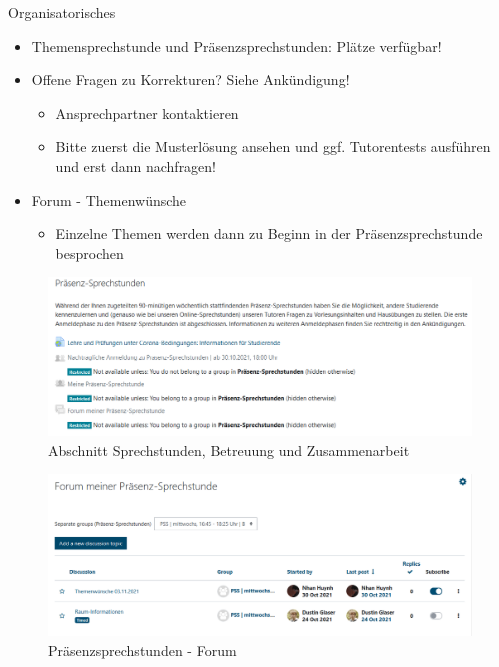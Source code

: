 \documentclass{../tuda-beamer}
\date{03. November 2021}
\begin{document}
  \maketitle

  \begin{frame}{Organisatorisches}
    \begin{itemize}
      \item Themensprechstunde und Präsenzsprechstunden: Plätze verfügbar!
      \item Offene Fragen zu Korrekturen? Siehe Ankündigung!
      \begin{itemize}
        \item Ansprechpartner kontaktieren
        \item Bitte zuerst die Musterlösung ansehen und ggf. Tutorentests ausführen und erst dann
        nachfragen!
      \end{itemize}
      \item Forum - Themenwünsche
      \begin{itemize}
        \item Einzelne Themen werden dann zu Beginn in der Präsenzsprechstunde besprochen
      \end{itemize}
    \end{itemize}
  \end{frame}

  \begin{frame}[c]
    \begin{figure}[h]
      \centering
      \includegraphics[width=\linewidth]{graphics/pss_forum.png}
      \caption{Abschnitt Sprechstunden, Betreuung und Zusammenarbeit}
    \end{figure}
  \end{frame}

  \begin{frame}[c]
    \begin{figure}[h]
      \centering
      \includegraphics[width=\linewidth]{graphics/pss_themenwuensche.png}
      \caption{Präsenzsprechstunden - Forum}
    \end{figure}
  \end{frame}
\end{document}
